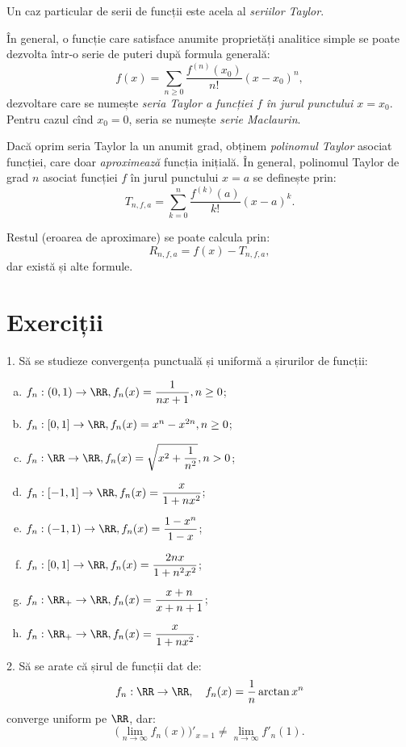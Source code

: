 Un caz particular de serii de funcții este acela al \emph{seriilor Taylor}.

În general, o funcție care satisface anumite proprietăți analitice simple se
poate dezvolta într-o serie de puteri după formula generală:
\[
    f(x) = \sum_{n \geq 0} \dfrac{f^{(n)}(x_0)}{n!}(x - x_0)^n,
\]
dezvoltare care se numește \emph{seria Taylor a funcției $ f $ în jurul%
punctului $ x = x_0 $}. Pentru cazul cînd $ x_0 = 0 $, seria se numește
\emph{serie Maclaurin}.

Dacă oprim seria Taylor la un anumit grad, obținem \emph{polinomul Taylor}
asociat funcției, care doar \emph{aproximează} funcția inițială.
În general, polinomul Taylor de grad $ n $ asociat funcției $ f $ în jurul
punctului $ x = a $ se definește prin:
\[
    T_{n, f, a} = \sum_{k = 0}^n \dfrac{f^{(k)}(a)}{k!} (x - a)^k.
\]

Restul (eroarea de aproximare) se poate calcula prin:
\[
    R_{n, f, a} = f(x) - T_{n, f, a},
\]
dar există și alte formule.

\section{Exerciții}

1. Să se studieze convergența punctuală și uniformă a șirurilor de funcții:
\begin{enumerate}[(a)]
\item $ f_n : (0, 1) \to \RR, f_n(x) = \dfrac{1}{nx + 1}, n \geq 0 $;
\item $ f_n : [0, 1] \to \RR, f_n(x) = x^n - x^{2n}, n \geq 0 $;
\item $ f_n : \RR \to \RR, f_n(x) = \sqrt{x^2 + \dfrac{1}{n^2}}, n > 0 $;
\item $ f_n : [-1,1] \to \RR, f_n(x) = \dfrac{x}{1 + nx^2} $;
\item $ f_n : (-1, 1) \to \RR, f_n(x) = \dfrac{1 - x^n}{1 - x} $;
\item $ f_n : [0, 1] \to \RR, f_n(x) = \dfrac{2nx}{1 + n^2 x^2} $;
\item $ f_n : \RR_+ \to \RR, f_n(x) = \dfrac{x + n}{x + n + 1} $;
\item $ f_n : \RR_+ \to \RR, f_n(x) = \dfrac{x}{1 + nx^2} $.
\end{enumerate}

\vspace{1cm}

2. Să se arate că șirul de funcții dat de:
\[
  f_n : \RR \to \RR, \quad f_n(x) = \frac{1}{n} \arctan x^n
\]
converge uniform pe $ \RR $, dar:
\[
  \Big( \lim_{n \to \infty} f_n(x) \Big)'_{x = 1} \neq \lim_{n \to \infty} f'_n(1).
\]

